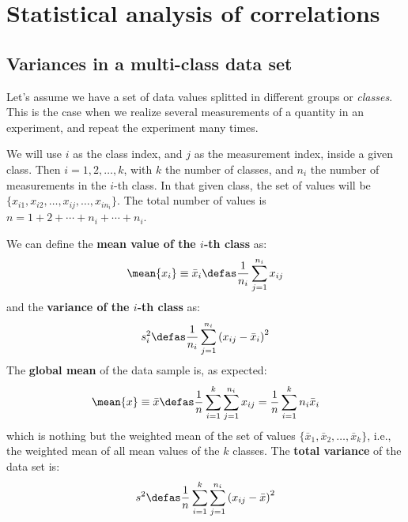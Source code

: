 %

\chapter{Statistical analysis of correlations}
\label{appendix:stats}

\section*{Variances in a multi-class data set}
\label{sec:variances}

Let's assume we have a set of data values splitted in different groups
or \emph{classes}. This is the case when we realize several
measurements of a quantity in an experiment, and repeat the experiment
many times.

We will use $i$ as the class index, and $j$ as the measurement index,
inside a given class. Then $i=1,2,\ldots,k$, with $k$ the number of
classes, and $n_i$ the number of measurements in the $i$-th class.  In
that given class, the set of values will be
$\{x_{i1},x_{i2},\ldots,x_{ij},\ldots,x_{in_i}\}$. The total number of values is
$n=1+2+\cdots+n_i+\cdots+n_i$.

We can define the \textbf{mean value of the $i$-th class } as:
%
\begin{equation}
  \label{eq:meani}
  \mean{x_i} \equiv \bar{x}_i \defas \frac{1}{n_i} \sum_{j=1}^{n_i} x_{ij}
\end{equation}
%
and the \textbf{variance of the $i$-th class} as:
%
\begin{equation}
  \label{eq:vari}
  s_i^2 \defas \frac{1}{n_i} \sum_{j=1}^{n_i} \left(x_{ij}-\bar{x}_i\right)^2
\end{equation}
%
The \textbf{global mean} of the data sample is, as expected:
%
\begin{equation}
  \label{eq:mean}
  \mean{x} \equiv \bar{x} \defas \frac{1}{n} \sum_{i=1}^k \sum_{j=1}^{n_i} x_{ij} 
  = \frac{1}{n} \sum_{i=1}^k n_i \bar{x}_i
\end{equation}
%
which is nothing but the weighted mean of the set of values
$\{\bar{x}_1, \bar{x}_2, \ldots,\bar{x}_k\}$, i.e., the weighted mean of all
mean values of the $k$ classes. The \textbf{total variance} of the
data set is:
%
\begin{equation}
  \label{eq:var}
  s^2 \defas \frac{1}{n} \sum_{i=1}^k \sum_{j=1}^{n_i} \left(x_{ij}-\bar{x}\right)^2
\end{equation}

